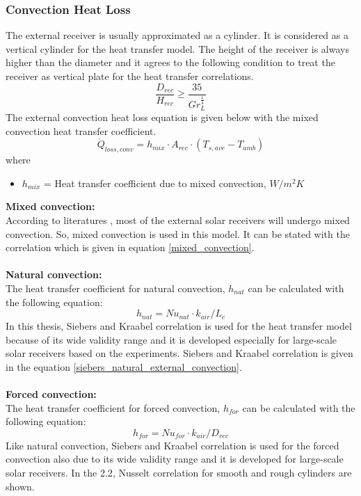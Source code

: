 \subsubsection{Convection Heat Loss}
The external receiver is usually approximated as a cylinder. It is considered as a vertical cylinder for the heat transfer model. The height of the receiver is always higher than the diameter and it agrees to the following condition to treat the receiver as vertical plate for the heat transfer correlations. 
\begin{equation}
\frac{D_{rec}}{H_{rec}}\ge \frac{35}{Gr_{L}^{\frac{1}{4}}}
\end{equation}
The external convection heat loss equation is given below with the mixed convection heat transfer coefficient.
\begin{equation}
\dot Q_{loss,conv} = h_{mix}\cdot A_{rec}\cdot (T_{s,ave}-T_{amb})
\end{equation}
where 
\begin{itemize}
	\item $h_{mix}$ = Heat transfer coefficient due to mixed convection, $W/m^2 K$
\end{itemize}
\textbf{{Mixed convection:}}\\[0.2cm]
According to literatures \cite{Siebers.1984}, most of the external solar receivers will undergo mixed convection. So, mixed convection is used in this model. It can be stated with the correlation \cite{Cengel.2003} \cite{Siebers.1984} which is given in equation \ref{mixed_convection}.\\\\
\textbf{{Natural convection:}}\\[0.2cm]
The heat transfer coefficient for natural convection, $h_{nat}$ can be calculated with the following equation:
\begin{equation}
h_{nat}=Nu_{nat}\cdot k_{air}/L_c
\end{equation}
In this thesis, Siebers and Kraabel correlation is used for the heat transfer model because of its wide validity range and it is developed especially for large-scale solar receivers based on the experiments. Siebers and Kraabel correlation is given in the equation \ref{siebers_natural_external_convection}.\\\\
\textbf{{Forced convection:}}\\[0.2cm]
The heat transfer coefficient for forced convection, $h_{for}$ can be calculated with the following equation:
\begin{equation}
h_{for}=Nu_{for}\cdot k_{air}/D_{rec}
\end{equation}
Like natural convection, Siebers and Kraabel correlation is used for the forced convection also due to its wide validity range and it is developed for large-scale solar receivers. In the \tablename{ 2.2}, Nusselt correlation for smooth and rough cylinders are shown. 
